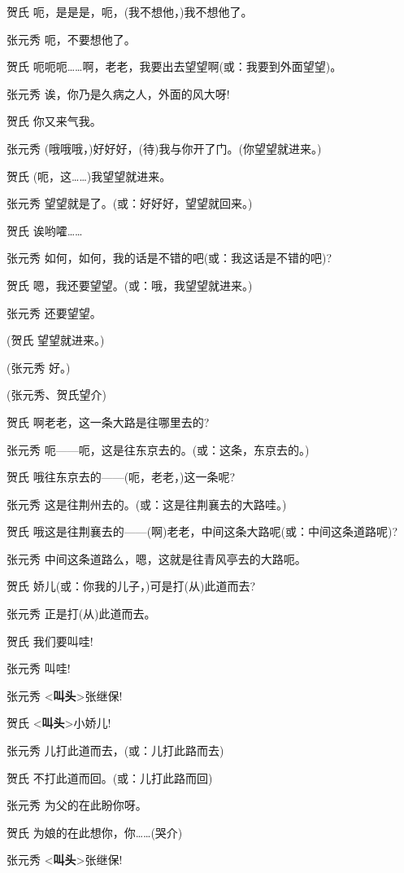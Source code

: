 贺氏 呃，是是是，呃，(我不想他，)我不想他了。

张元秀 呃，不要想他了。

贺氏
呃呃呃\ldots{}\ldots{}啊，老老，我要出去望望啊(或：我要到外面望望)。

张元秀 诶，你乃是久病之人，外面的风大呀!

贺氏 你又来气我。

张元秀 (哦哦哦，)好好好，(待)我与你开了门。(你望望就进来。)

贺氏 (呃，这\ldots{}\ldots{})我望望就进来。

张元秀 望望就是了。(或：好好好，望望就回来。)

贺氏 诶哟嚯\ldots{}\ldots{}

张元秀 如何，如何，我的话是不错的吧(或：我这话是不错的吧)?

贺氏 嗯，我还要望望。(或：哦，我望望就进来。)

张元秀 还要望望。

(贺氏 望望就进来。)

(张元秀 好。)

(张元秀、贺氏望介)

贺氏 啊老老，这一条大路是往哪里去的?

张元秀 呃------呃，这是往东京去的。(或：这条，东京去的。)

贺氏 哦往东京去的------(呃，老老，)这一条呢?

张元秀 这是往荆州去的。(或：这是往荆襄去的大路哇。)

贺氏 哦这是往荆襄去的------(啊)老老，中间这条大路呢(或：中间这条道路呢)?

张元秀 中间这条道路么，嗯，这就是往青风亭去的大路呃。

贺氏 娇儿(或：你我的儿子，)可是打(从)此道而去?

张元秀 正是打(从)此道而去。

贺氏 我们要叫哇!

张元秀 叫哇!

张元秀 \textless{}\textbf{叫头}\textgreater{}张继保!

贺氏 \textless{}\textbf{叫头}\textgreater{}小娇儿!

张元秀 儿打此道而去，(或：儿打此路而去)

贺氏 不打此道而回。(或：儿打此路而回)

张元秀 为父的在此盼你呀。

贺氏 为娘的在此想你，你\ldots{}\ldots{}(哭介)

张元秀 \textless{}\textbf{叫头}\textgreater{}张继保!


